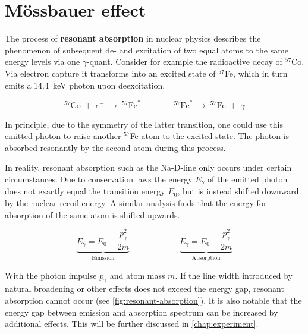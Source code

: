 
\section{Mössbauer effect}
\label{sec:mössbauer-effect}

The process of \textbf{resonant absorption} in nuclear physics describes the 
phenomenon of subsequent de- and excitation of two equal atoms to the same energy 
levels via one $\gamma$-quant. Consider for example the radioactive decay of 
$^{57}$Co. Via electron capture it transforms into an excited state of $^{57}$Fe,
which in turn emits a \SI{14.4}{\kilo\electronvolt} photon upon deexcitation.

\begin{equation*}
^{57}\text{Co}\;+\;e^-\;\longrightarrow\;^{57}\text{Fe}^*\qquad\qquad^{57}\text{Fe}^*\;\longrightarrow\;^{57}\text{Fe}\;+\;\gamma  
\end{equation*}

In principle, due to the symmetry of the latter transition, one could use this 
emitted photon to raise another $^{57}$Fe atom to the excited state. The photon is 
absorbed resonantly by the second atom during this process.

In reality, resonant absorption such as the Na-D-line only occurs under certain
circumstances. Due to conservation laws the energy $E_\gamma$ of the emitted photon
does not exactly equal the transition energy $E_0$, but is instead shifted downward
by the nuclear recoil energy. A similar analysis finds that the energy for absorption
of the same atom is shifted upwards. 

\begin{equation}
\underbrace{E_\gamma = E_0 - \frac{p_\gamma^2}{2m}}_\text{Emission} \qquad\qquad\qquad \underbrace{E_\gamma = E_0 + \frac{p_\gamma^2}{2m}}_\text{Absorption}\label{eq:energy-gap}
\end{equation}

With the photon impulse $p_\gamma$ and atom mass $m$. If the line width introduced by
natural broadening or other effects does not exceed the energy gap, resonant 
absorption cannot occur (see \autoref{fig:resonant-absorption}). It is also notable 
that the energy gap between emission and absorption spectrum can be increased by 
additional effects. This will be further discussed in \autoref{chap:experiment}.

